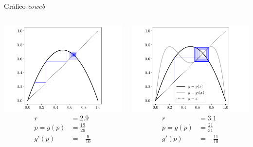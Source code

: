 \documentclass[9pt, aspectratio=169]{beamer}
\begin{document}
\begin{frame}{Gráfico \textit{coweb}}
  \begin{columns}
    \begin{center}
      \includegraphics[scale=0.35]{figs/coweb-01.pdf}
      \begin{align*}
        r        & = 2.9           \\
        p = g(p) & = \frac{19}{29} \\
        g'(p)    & = -\frac{9}{10}
      \end{align*}
    \end{center} \pause

    \begin{center}
      \includegraphics[scale=0.35]{figs/coweb-02.pdf}
      \begin{align*}
        r        & = 3.1            \\
        p = g(p) & = \frac{21}{31}  \\
        g'(p)    & = -\frac{11}{10}
      \end{align*}
    \end{center} \pause


\end{columns}
\end{frame}
\end{document}
